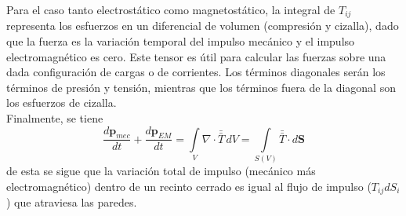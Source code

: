 \indent Para el caso tanto electrostático como magnetostático, la integral de $T_{ij}$ representa los esfuerzos en un diferencial de volumen (compresión y cizalla), dado que la fuerza es la variación temporal del impulso mecánico y el impulso electromagnético es cero. Este tensor es útil para calcular las fuerzas sobre una dada configuración de cargas o de corrientes. Los términos diagonales serán los términos de presión y tensión, mientras que los términos fuera de la diagonal son los esfuerzos de cizalla.\\
\indent Finalmente, se tiene
\begin{equation}
    \frac{d\textbf{p}_{mec}}{dt} + \frac{d\textbf{p}_{EM}}{dt} =
    \int\limits_{V} \nabla\cdot \bar{\bar{T}}\,dV = 
    \int\limits_{S(V)} \bar{\bar{T}}\cdot d\textbf{S}
        \label{ec:BalanceImpulsoEM}
\end{equation}
de esta se sigue que la variación total de impulso (mecánico más electromagnético) dentro de un recinto cerrado es igual al flujo de impulso ($T_{ij}dS_{i}$) que atraviesa las paredes.




